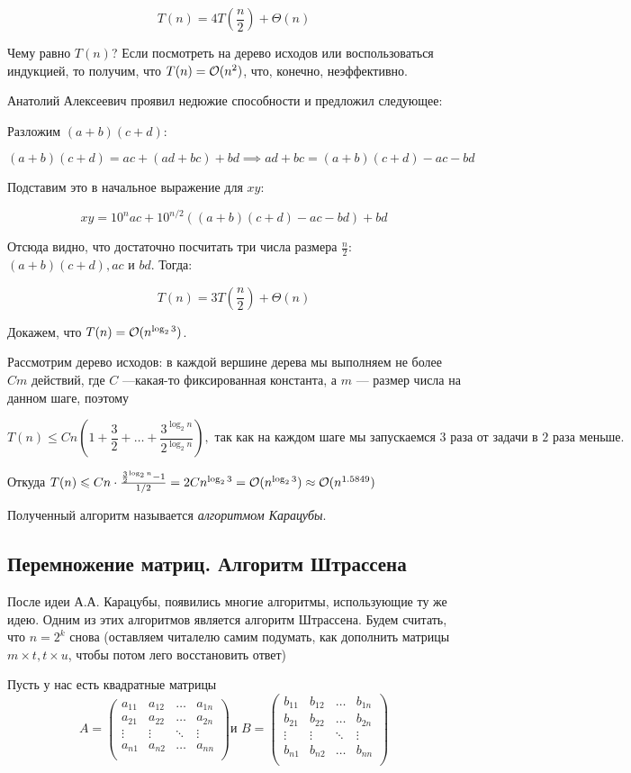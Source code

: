 \documentclass[a4paper, 12pt]{article}
\begin{document}
\[T(n) = 4T\left( \frac{n}{2} \right) + \Theta(n)\]

Чему равно $T(n)$? Если посмотреть на дерево исходов или воспользоваться 
индукцией, то получим, что $T(n) = \mathcal{O}(n^2)$, что, конечно,
неэффективно.

Анатолий Алексеевич проявил недюжие способности и предложил
следующее:

Разложим $(a + b)(c + d)$:

\[(a+b)(c+d) = ac+(ad+bc) + bd \implies ad + bc = (a + b)(c + d) - ac - bd\]

Подставим это в начальное выражение для $xy$:

\[xy = 10^{n}ac + 10^{n/2}((a + b)(c + d) - ac - bd)+bd\]

Отсюда видно, что достаточно посчитать три числа размера $\frac{n}{2}$: $(a + b)(c + d), ac$ и $bd$. Тогда:

\[T(n) = 3T\left( \frac{n}{2} \right) + \Theta(n)\]

Докажем, что $T(n) = \mathcal{O}(n^{\log_2 3})$.

Рассмотрим дерево исходов: в каждой вершине дерева мы выполняем не более
$Cm$ действий, где $C$ ---какая-то фиксированная константа, а $m$ --- размер числа на данном шаге, поэтому 

\[
  T(n) \leqslant Cn\left(1 + \frac{3}{2} + \ldots + \frac{3^{\log_2 n}}{2^{
  \log_2 n}}\right), \text{ так как
  на каждом шаге мы запускаемся 3 раза от задачи в 2 раза меньше.}
\]

Откуда $T(n) \leqslant Cn \cdot \frac{\frac{3}{2}^{\log_2 n} - 1}{1/2} = 
2Cn^{\log_2 3} = \mathcal{O}(n^{\log_2 3}) \approx \mathcal{O}(n^{1.5849})$

Полученный алгоритм называется \emph{алгоритмом Карацубы}.

\subsection{Перемножение матриц. Алгоритм Штрассена}

После идеи А.А. Карацубы, появились многие алгоритмы, использующие ту же идею.
Одним из этих алгоритмов является алгоритм Штрассена. Будем считать, что $n = 
2^k$ снова (оставляем читалелю самим подумать, как дополнить матрицы $m \times t,
t \times u$, чтобы потом лего восстановить ответ)

Пусть у нас есть квадратные матрицы
\[A = \begin{pmatrix}
a_{11} & a_{12} & \ldots & a_{1n} \\
a_{21} & a_{22} & \ldots & a_{2n} \\
\vdots & \vdots & \ddots & \vdots \\
a_{n1} & a_{n2} & \ldots & a_{nn} \\
\end{pmatrix}
\text{и } 
B = \begin{pmatrix}
b_{11} & b_{12} & \ldots & b_{1n} \\
b_{21} & b_{22} & \ldots & b_{2n} \\
\vdots & \vdots & \ddots & \vdots \\
b_{n1} & b_{n2} & \ldots & b_{nn} \\
\end{pmatrix}\]
\end{document}
